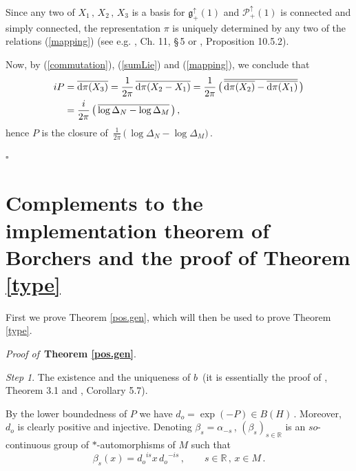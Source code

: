 \documentclass[reqno]{amsart}
\theoremstyle{definition}
\theoremstyle{remark}
\numberwithin{equation}{section}
\theoremstyle{plain}
\begin{document}
Since any two of $X_1\, ,\, X_2\, ,\, X_3$ is a basis for
$\mathfrak g_+^\uparrow (1)$ and $\mathcal P_+^\uparrow (1)$ is
connected and simply connected, the representation $\pi$ is uniquely
determined by any two of the relations (\ref{mapping}) (see e.g.
\cite{Ba-Ra}, Ch. 11, \S$\,$5 or \cite{Schm}, Proposition 10.5.2).

Now, by (\ref{commutation}), (\ref{sumLie}) and (\ref{mapping}),
we conclude that
\begin{align*}
i P &=\overline{\text{\rm d}\pi (X_3)} =
\frac 1{2\pi}\,\overline{\text{\rm d}\pi (X_2 -X_1)}=
\frac 1{2\pi}\,\big(\, \overline{\overline{\text{\rm d}\pi (X_2)}
-\overline{\text{\rm d}\pi (X_1)}}\, \big) \\
&= \frac i{2\pi}\,\big(\, \overline{\log \Delta_N -\log \Delta_M}
\,\big)\, ,
\end{align*}
hence $P$ is the closure of $\,\displaystyle \frac 1{2\pi}\,
\big(\,\log \Delta_N -\log \Delta_M \big)\,$.

\hfill $\square\quad$

\bigskip
\section{Complements to the implementation theorem of Borchers
and the proof of Theorem \ref{type}}
\bigskip

First we prove Theorem \ref{pos.gen},
which will then be used to prove Theorem \ref{type}.
\medskip

{\it Proof of }$\,${\bf Theorem \ref{pos.gen}}.
\medskip

{\it Step 1}. {\sc The existence and the uniqueness of $b\,$}
(it is essentially the proof of \cite{Arv}, Theorem 3.1 and
\cite{Z2}, Corollary 5.7).
\medskip

By the lower boundedness of $P$ we have $d_o=\exp (-P)\in B(H)\,$.
Moreover, $d_o$ is clearly positive and injective. Denoting
$\beta_s =\alpha_{-s}\,$, $(\beta_s )_{s\in\mathbb R}$ is
an $so$-continuous group of $*$-automorphisms of $M$ such that
\begin{equation*}
\beta_s (x) ={d_o}^{is} x\, {d_o}^{-is}\, ,\qquad s\in\mathbb R
\, ,\, x\in M\, .
\end{equation*}
\end{document}
